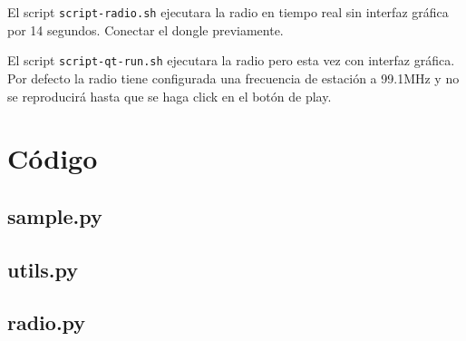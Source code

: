El script \texttt{script-radio.sh} ejecutara la radio en tiempo real sin interfaz gráfica por 14 segundos. Conectar el dongle previamente.

El script \texttt{script-qt-run.sh} ejecutara la radio pero esta vez con interfaz gráfica. Por defecto la radio tiene configurada una frecuencia de estación a 99.1MHz y no se reproducirá hasta que se haga click en el botón de play.
\newpage

\section{Código}

\subsection{sample.py}\label{ap:sample.py}


\newpage

\subsection{utils.py}\label{ap:utils.py}


\newpage

\subsection{radio.py}\label{ap:radio.py}

